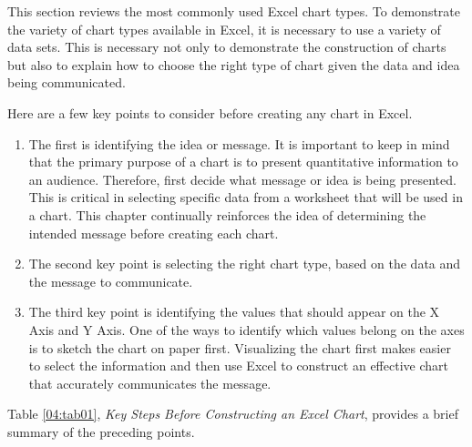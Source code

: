 This section reviews the most commonly used Excel chart types. To demonstrate the variety of chart types available in Excel, it is necessary to use a variety of data sets. This is necessary not only to demonstrate the construction of charts but also to explain how to choose the right type of chart given the data and idea being communicated.

Here are a few key points to consider before creating any chart in Excel.

\begin{enumerate}
	\item The first is identifying the idea or message. It is important to keep in mind that the primary purpose of a chart is to present quantitative information to an audience. Therefore, first decide what message or idea is being presented. This is critical in selecting specific data from a worksheet that will be used in a chart. This chapter continually reinforces the idea of determining the intended message before creating each chart.
	\item The second key point is selecting the right chart type, based on the data and the message to communicate.
	\item The third key point is identifying the values that should appear on the X Axis and Y Axis. One of the ways to identify which values belong on the axes is to sketch the chart on paper first. Visualizing the chart first makes easier to select the information and then use Excel to construct an effective chart that accurately communicates the message. 
\end{enumerate}

Table \ref{04:tab01}, \textit{Key Steps Before Constructing an Excel Chart}, provides a brief summary of the preceding points.


